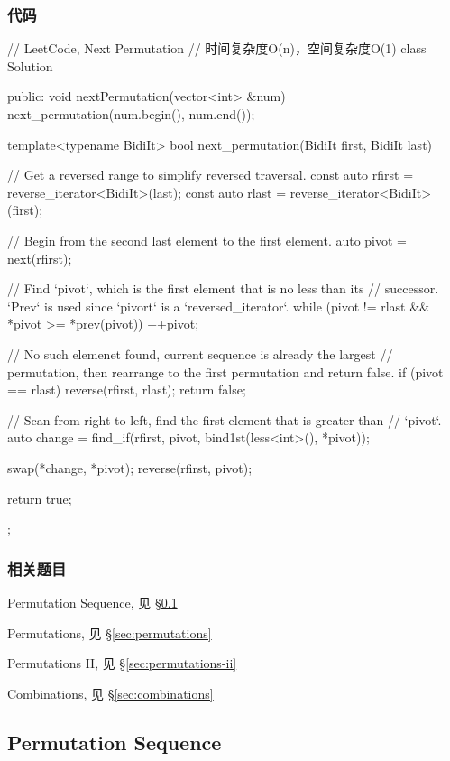 \subsubsection{代码}
\begin{Code}
// LeetCode, Next Permutation
// 时间复杂度O(n)，空间复杂度O(1)
class Solution {
public:
    void nextPermutation(vector<int> &num) {
        next_permutation(num.begin(), num.end());
    }

    template<typename BidiIt>
    bool next_permutation(BidiIt first, BidiIt last) {
        // Get a reversed range to simplify reversed traversal.
        const auto rfirst = reverse_iterator<BidiIt>(last);
        const auto rlast = reverse_iterator<BidiIt>(first);

        // Begin from the second last element to the first element.
        auto pivot = next(rfirst);

        // Find `pivot`, which is the first element that is no less than its
        // successor.  `Prev` is used since `pivort` is a `reversed_iterator`.
        while (pivot != rlast && *pivot >= *prev(pivot))
            ++pivot;

        // No such elemenet found, current sequence is already the largest
        // permutation, then rearrange to the first permutation and return false.
        if (pivot == rlast) {
            reverse(rfirst, rlast);
            return false;
        }

        // Scan from right to left, find the first element that is greater than
        // `pivot`.
        auto change = find_if(rfirst, pivot, bind1st(less<int>(), *pivot));

        swap(*change, *pivot);
        reverse(rfirst, pivot);

        return true;
    }
};
\end{Code}


\subsubsection{相关题目}
\begindot
\item Permutation Sequence, 见 \S \ref{sec:permutation-sequence}
\item Permutations, 见 \S \ref{sec:permutations}
\item Permutations II, 见 \S \ref{sec:permutations-ii}
\item Combinations, 见 \S \ref{sec:combinations}
\myenddot


\subsection{Permutation Sequence} %
\label{sec:permutation-sequence}


